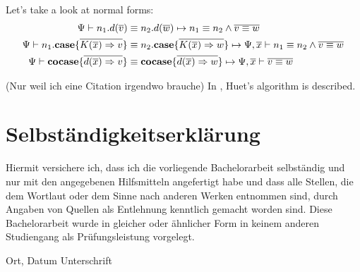\documentclass[twoside,12pt,a4paper]{article}
\begin{document}
Let's  take a look at normal forms:
\begin{align*}
    \Psi \vdash n_1.d({\overline{v}})&\equiv n_2.d({\overline{w}})
    \mapsto n_1 \equiv n_2 \wedge \overline{v\equiv w}\\
    \Psi \vdash n_1.\textbf{case}\{\overline{K(\overline{x})\Rightarrow v}\}&\equiv n_2.\textbf{case}\{\overline{K(\overline{x})\Rightarrow w}\}
    \mapsto \Psi, \overline{x} \vdash n_1 \equiv n_2\wedge \overline{v\equiv w}\\
    \Psi \vdash \textbf{cocase}\{\overline{d(\overline{x})\Rightarrow v}\}&\equiv \textbf{cocase}\{\overline{d(\overline{x})\Rightarrow w}\}
    \mapsto\Psi,\overline{x} \vdash \overline{v \equiv w}
\end{align*}





\newpage
(Nur weil ich eine Citation irgendwo brauche)
In \cite{DBLP:books/el/RV01/Dowek01}, Huet's algorithm is described. %








\cleardoublepage

\thispagestyle{empty}
\section*{Selbständigkeitserklärung}

Hiermit versichere ich, dass ich die vorliegende Bachelorarbeit 
selbständig und nur mit den angegebenen Hilfsmitteln angefertigt habe und dass alle Stellen, die dem Wortlaut oder dem 
Sinne nach anderen Werken entnommen sind, durch Angaben von Quellen als 
Entlehnung kenntlich gemacht worden sind. 
Diese Bachelorarbeit wurde in gleicher oder ähnlicher Form in keinem anderen 
Studiengang als Prüfungsleistung vorgelegt. 

\vskip 3cm

Ort, Datum	\hfill Unterschrift \hfill 


\end{document}
